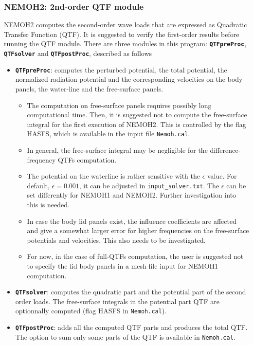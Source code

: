 \documentclass[12pt,a4paper,titlepage]{article}
\begin{document}
\subsubsection{NEMOH2: 2nd-order QTF module}
NEMOH2 computes the second-order wave loads that are expressed as Quadratic Transfer Function (QTF). It is suggested to verify the first-order results before running the QTF module. There are three modules in this program: \texttt{\textbf{QTFpreProc}}, \texttt{\textbf{QTFsolver}} and \texttt{\textbf{QTFpostProc}}, described as follows
\begin{itemize}
\item \texttt{\textbf{QTFpreProc}}: computes the perturbed potential, the total potential, the normalized radiation potential and the corresponding velocities on the body panels, the water-line and the free-surface panels.
\begin{itemize}
\item The computation on free-surface panels requires possibly long computational time. Then, it is suggested not to compute the free-surface integral for the first execution of NEMOH2. This is controlled by the flag HASFS, which is available in the input file \texttt{Nemoh.cal}.
\item In general, the free-surface integral may be negligible for the difference-frequency QTFs computation.
\item The potential on the waterline is rather sensitive with the $\epsilon$ value. For default, $\epsilon=0.001$, it can be adjusted in \texttt{input\_solver.txt}. The $\epsilon$ can be set differently for NEMOH1 and NEMOH2. Further investigation into this is needed.
\item In case the body lid panels exist, the influence coefficients are affected and give a somewhat larger error for higher frequencies on the free-surface potentials and velocities. This also needs to be investigated.
\item For now, in the case of full-QTFs computation, the user is suggested not to specify the lid body panels in a mesh file input for NEMOH1 computation.
\end{itemize}
\item \texttt{\textbf{QTFsolver}}: computes the quadratic part and the potential part of the second order loads. The free-surface integrals in the potential part QTF are optionnally computed (flag HASFS in \texttt{Nemoh.cal}).
\item \texttt{\textbf{QTFpostProc}}: adds all the computed QTF parts and produces the total QTF. The option to sum only some parts of the QTF is available in \texttt{Nemoh.cal}.
\end{itemize}
\end{document}
